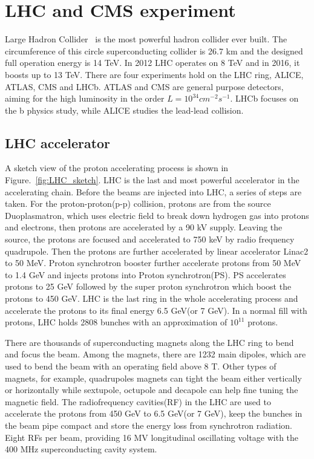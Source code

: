 \chapter{LHC and CMS experiment}

Large Hadron Collider~\cite{LHC_refer} is the most powerful hadron collider ever built. The circumference of this circle superconducting collider is 26.7 km and the designed full operation energy is 14 TeV. In 2012 LHC operates on 8 TeV and in 2016, it boosts up to 13 TeV. There are four experiments hold on the LHC ring, ALICE, ATLAS, CMS and LHCb. ATLAS and CMS are general purpose detectors, aiming for the high luminosity in the order $L=10^{34} cm^{-2}s^{-1}$. LHCb focuses on the b physics study, while ALICE studies the lead-lead collision.

\section{LHC accelerator}

A sketch view of the proton accelerating process is shown in Figure.~\ref{fig:LHC_sketch}. LHC is the last and most powerful accelerator in the accelerating chain. Before the beams are injected into LHC, a series of steps are taken. For the proton-proton(p-p) collision, protons are from the source Duoplasmatron, which uses electric field to break down hydrogen gas into protons and electrons, then protons are accelerated by a 90 kV supply. Leaving the source, the protons are focused and accelerated to 750 keV by radio frequency quadrupole. Then the protons are further accelerated by linear accelerator Linac2 to 50 MeV. Proton synchrotron booster further accelerate protons from 50 MeV to 1.4 GeV and injects protons into Proton synchrotron(PS). PS accelerates protons to 25 GeV followed by the super proton synchrotron which boost the protons to 450 GeV. LHC is the last ring in the whole accelerating process and accelerate the protons to its final energy 6.5 GeV(or 7 GeV). In a normal fill with protons, LHC holds 2808 bunches with an approximation of $10^{11}$ protons.

There are thousands of superconducting magnets along the LHC ring to bend and focus the beam. Among the magnets, there are 1232 main dipoles, which are used to bend the beam with an operating field above 8 T. Other types of magnets, for example, quadrupoles magnets can tight the beam either vertically or horizontally while  sextupole, octupole and decapole can help fine tuning the magnetic field. The radiofrequency cavities(RF) in the LHC are used to accelerate the protons from 450 GeV to 6.5 GeV(or 7 GeV), keep the bunches in the beam pipe compact and store the energy loss from synchrotron radiation. Eight RFs per beam, providing 16 MV  longitudinal oscillating voltage with the 400 MHz superconducting cavity system. 

